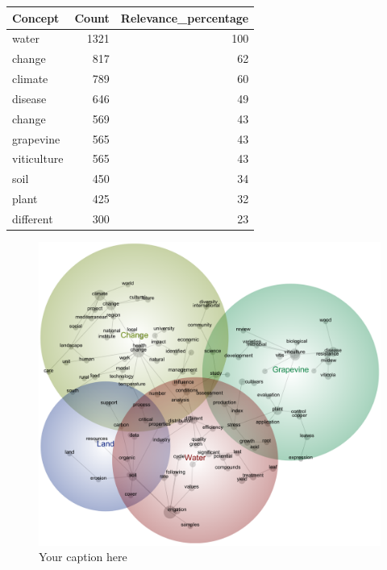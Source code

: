 \begin{table}[h]\label{tab:lexi}
    \begin{tabular}{@{}lrr@{}}
    \toprule
    \textbf{Concept} & \multicolumn{1}{l}{\textbf{Count}} & \multicolumn{1}{l}{\textbf{Relevance_percentage}} \\ \midrule
    water & 1321 & 100 \\
    change & 817 & 62 \\
    climate & 789 & 60 \\
    disease & 646 & 49 \\
    change & 569 & 43 \\
    grapevine & 565 & 43 \\
    viticulture & 565 & 43 \\
    soil & 450 & 34 \\
    plant & 425 & 32 \\
    different & 300 & 23 \\ \bottomrule
    \end{tabular}
    \end{table}
    
    \begin{figure}[h]
        \centering
        \includegraphics[width=\linewidth]{Winegrowing-concept-map}
        \caption{Your caption here}
        \label{fig:lexi}
    \end{figure}

